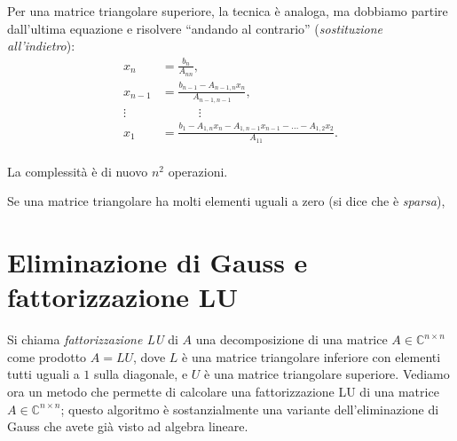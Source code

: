 \documentclass[a4paper]{report}
\theoremstyle{definiton}
\theoremstyle{remark}
\begin{document}
Per una matrice triangolare superiore, la tecnica è analoga, ma dobbiamo partire dall'ultima equazione e risolvere ``andando al contrario'' (\emph{sostituzione all'indietro}):
\begin{align*}
x_n &= \frac{b_n}{A_{nn}},\\
x_{n-1} &= \frac{b_{n-1} - A_{n-1,n}x_n}{A_{n-1,n-1}},\\
\vdots & \quad \quad \quad \vdots\\
x_1 &= \frac{b_1 - A_{1,n}x_n - A_{1,n-1}x_{n-1} - \dots -A_{1,2}x_{2}}{A_{11}}.\\
\end{align*}

La complessità è di nuovo $n^2$ operazioni.

Se una matrice triangolare ha molti elementi uguali a zero (si dice che è \emph{sparsa}), 


\section{Eliminazione di Gauss e fattorizzazione LU}

Si chiama \emph{fattorizzazione LU} di $A$ una decomposizione di una matrice $A\in\mathbb{C}^{n\times n}$ come prodotto $A=LU$, dove $L$ è una matrice triangolare inferiore con elementi tutti uguali a $1$ sulla diagonale, e $U$ è una matrice triangolare superiore. Vediamo ora un metodo che permette di calcolare una fattorizzazione LU di una matrice $A \in \mathbb{C}^{n\times n}$; questo algoritmo è sostanzialmente una variante dell'eliminazione di Gauss che avete già visto ad algebra lineare.
\end{document}
